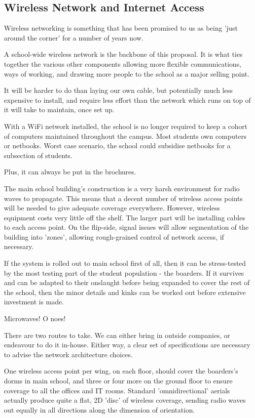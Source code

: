 \documentclass[a4paper,leqno,titlepage]{article}
\begin{document}
\subsection{Wireless Network and Internet Access}


Wireless networking is something that has been promised to us as being 'just
around the corner' for a number of years now.


A school-wide wireless network is the backbone of this proposal. It is
what ties together the various other components allowing more flexible
communications, ways of working, and drawing more people to the school as a
major selling point.


It will be harder to do than laying our own cable, but potentially much less
expensive to install, and require less effort than the network which runs
on top of it will take to maintain, once set up.


With a WiFi network installed, the school is no longer required to keep a cohort
of computers maintained throughout the campus. Most students own computers
or netbooks. Worst case scenario, the school could subsidise netbooks for a
subsection of students.


Plus, it can always be put in the brochures.


The main school building's construction is a very harsh environment for radio
waves to propagate. This means that a decent number of wireless access points
will be needed to give adequate coverage everywhere. However, wireless equipment
costs very little off the shelf. The larger part will be installing cables
to each access point. On the flip-side, signal issues will allow segmentation
of the building into 'zones', allowing rough-grained control of
network access, if necessary.


If the system is rolled out to main school first of all, then it can be
stress-tested by the most testing part of the student population - the boarders.
If it survives and can be adapted to their onslaught before being expanded to
cover the rest of the school, then the minor details and kinks can be worked out
before extensive investment is made.


Microwaves! O noes!


There are two routes to take. We can either bring in outside companies, or
endeavour to do it in-house. Either way, a clear set of specifications are
necessary to advise the network architecture choices.


One wireless access point per wing, on each floor, should cover the boarders's
dorms in main school, and three or four more on the ground floor to ensure
coverage to all the offices and IT rooms. Standard 'omnidirectional' aerials
actually produce quite a flat, 2D 'disc' of wireless coverage, sending radio
waves out equally in all directions along the dimension of orientation.
\end{document}
